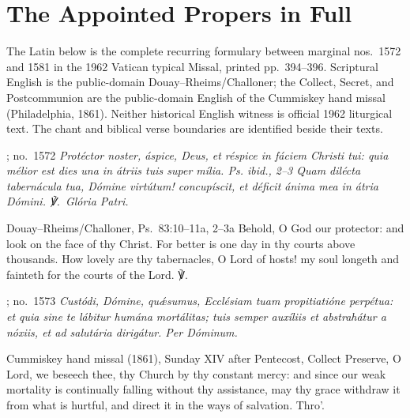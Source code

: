 \section*{The Appointed Propers in Full}\label{appointed-text}

\noindent The Latin below is the complete recurring formulary between marginal
nos.~1572 and 1581 in the 1962 Vatican typical Missal, printed pp.~394--396.
Scriptural
English is the public-domain Douay--Rheims/Challoner; the Collect, Secret, and
Postcommunion are the public-domain English of the Cummiskey hand missal
(Philadelphia, 1861). Neither historical English witness is official 1962
liturgical text. The chant and biblical verse boundaries are identified beside their texts.

\label{introit}
\begin{massbox}{; no.~1572}\itshape
Protéctor noster, áspice, Deus, et réspice in fáciem Christi tui: quia mélior
est dies una in átriis tuis super mília. \textnormal{Ps. ibid., 2--3} Quam
dilécta tabernácula tua, Dómine virtútum! concupíscit, et déficit ánima mea in
átria Dómini. ℣.~Glória Patri.
\finishfulltextelement
\begin{fulltextenglish}{Douay--Rheims/Challoner, Ps.~83:10--11a, 2--3a}
Behold, O God our protector: and look on the face of thy Christ. For better is
one day in thy courts above thousands. How lovely are thy tabernacles, O Lord
of hosts! my soul longeth and fainteth for the courts of the Lord.
℣.~
\end{fulltextenglish}

\label{collect}
\begin{massbox}{; no.~1573}\itshape
Custódi, Dómine, quǽsumus, Ecclésiam tuam propitiatióne perpétua: et quia sine
te lábitur humána mortálitas; tuis semper auxíliis et abstrahátur a nóxiis, et
ad salutária dirigátur. Per Dóminum.
\finishfulltextelement
\begin{fulltextenglish}{Cummiskey hand missal (1861), Sunday XIV after Pentecost, Collect}
Preserve, O Lord, we beseech thee, thy Church by thy constant mercy: and since
our weak mortality is continually falling without thy assistance, may thy
grace withdraw it from what is hurtful, and direct it in the ways of
salvation. Thro'.
\end{fulltextenglish}


\end{massbox}
\end{massbox}
